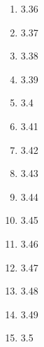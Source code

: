 \documentclass[6pt]{article}
\begin{document}
\begin{multicols}{4}
\begin{enumerate}
		\item 3.36
		\item 3.37
		\item 3.38
		\item 3.39
		\item 3.4
		\item 3.41
		\item 3.42
		\item 3.43
		\item 3.44
		\item 3.45
		\item 3.46
		\item 3.47
		\item 3.48
		\item 3.49
		\item 3.5
	\end{enumerate}
\end{multicols}
\end{document}
